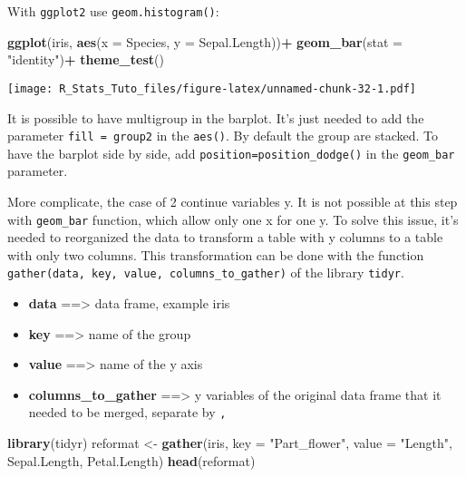 \documentclass[
]{article}
\newenvironment{Shaded}{\begin{snugshade}}{\end{snugshade}}
\newcommand{\AttributeTok}[1]{\textcolor[rgb]{0.13,0.29,0.53}{#1}}
\newcommand{\FunctionTok}[1]{\textcolor[rgb]{0.13,0.29,0.53}{\textbf{#1}}}
\newcommand{\NormalTok}[1]{#1}
\newcommand{\OtherTok}[1]{\textcolor[rgb]{0.56,0.35,0.01}{#1}}
\newcommand{\SpecialCharTok}[1]{\textcolor[rgb]{0.81,0.36,0.00}{\textbf{#1}}}
\newcommand{\StringTok}[1]{\textcolor[rgb]{0.31,0.60,0.02}{#1}}
\providecommand{\tightlist}{%
  \setlength{\itemsep}{0pt}\setlength{\parskip}{0pt}}
\begin{document}
With \texttt{ggplot2} use \texttt{geom.histogram()}:

\begin{Shaded}
\begin{Highlighting}[]
\FunctionTok{ggplot}\NormalTok{(iris, }\FunctionTok{aes}\NormalTok{(}\AttributeTok{x =}\NormalTok{ Species, }\AttributeTok{y =}\NormalTok{ Sepal.Length))}\SpecialCharTok{+}
  \FunctionTok{geom\_bar}\NormalTok{(}\AttributeTok{stat =} \StringTok{"identity"}\NormalTok{)}\SpecialCharTok{+}
  \FunctionTok{theme\_test}\NormalTok{()}
\end{Highlighting}
\end{Shaded}

\texttt{[image: R\_Stats\_Tuto\_files/figure-latex/unnamed-chunk-32-1.pdf]}

It is possible to have multigroup in the barplot. It's just needed to
add the parameter \texttt{fill\ =\ group2} in the \texttt{aes()}. By
default the group are stacked. To have the barplot side by side, add
\texttt{position=position\_dodge()} in the \texttt{geom\_bar} parameter.

More complicate, the case of 2 continue variables y. It is not possible
at this step with \texttt{geom\_bar} function, which allow only one x
for one y. To solve this issue, it's needed to reorganized the data to
transform a table with y columns to a table with only two columns. This
transformation can be done with the function
\texttt{gather(data,\ key,\ value,\ columns\_to\_gather)} of the library
\texttt{tidyr}.

\begin{itemize}
\tightlist
\item
  \textbf{data} ==\textgreater{} data frame, example iris
\item
  \textbf{key} ==\textgreater{} name of the group
\item
  \textbf{value} ==\textgreater{} name of the y axis
\item
  \textbf{columns\_to\_gather} ==\textgreater{} y variables of the
  original data frame that it needed to be merged, separate by
  \texttt{,}\\
\end{itemize}

\begin{Shaded}
\begin{Highlighting}[]
\FunctionTok{library}\NormalTok{(tidyr)}
\NormalTok{reformat }\OtherTok{\textless{}{-}} \FunctionTok{gather}\NormalTok{(iris, }\AttributeTok{key =} \StringTok{"Part\_flower"}\NormalTok{, }\AttributeTok{value =} \StringTok{"Length"}\NormalTok{, Sepal.Length, Petal.Length)}
\FunctionTok{head}\NormalTok{(reformat)}
\end{Highlighting}
\end{Shaded}
\end{document}
